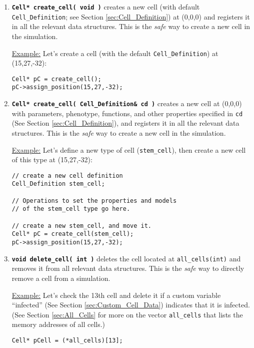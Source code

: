 \documentclass[12pt]{article}
\renewcommand{\v}{\verb}
\newcommand{\smallcode}[1]{\textbf{\texttt{#1}}}
\begin{document}
\begin{enumerate}

\item 
\smallcode{Cell* create\_cell( void )} creates a new cell (with 
default \v|Cell_Definition|; see Section \ref{sec:Cell_Definition}) at 
(0,0,0) and registers it in all the relevant data structures. 
This is the \emph{safe} way to create a new cell in the simulation. 

\underline{Example:} Let's create a cell (with the default 
\v|Cell_Definition|) at (15,27,-32): 

\begin{verbatim}
Cell* pC = create_cell(); 
pC->assign_position(15,27,-32);
\end{verbatim}

\item 
\smallcode{Cell* create\_cell( Cell\_Definition\& cd )} 
creates a new cell at (0,0,0) with parameters, phenotype, functions, 
and other properties specified in \v|cd| 
(See Section \ref{sec:Cell_Definition}),  and registers it in all the 
relevant data structures. 
This is the \emph{safe} way to create a new cell in the simulation. 

\underline{Example:} Let's define a new type of cell (\v|stem_cell|), then 
create a new cell of this type at (15,27,-32): 

\begin{verbatim}
// create a new cell definition 
Cell_Definition stem_cell; 

// Operations to set the properties and models 
// of the stem_cell type go here. 

// create a new stem_cell, and move it. 
Cell* pC = create_cell(stem_cell); 
pC->assign_position(15,27,-32);
\end{verbatim}

\item 
\smallcode{void delete\_cell( int )} deletes the cell 
located at \v|all_cells(int)| and removes it from 
all relevant data structures.  
This is the \emph{safe} way to directly remove a cell 
from a simulation. 

\underline{Example:} Let's check the 13th cell and delete it 
if a custom variable ``infected'' (See Section \ref{sec:Custom_Cell_Data}) indicates that 
 it is infected. (See Section \ref{sec:All_Cells} for more 
on the vector \v|all_cells| that lists the memory addresses of all cells.)
 
\begin{verbatim}
Cell* pCell = (*all_cells)[13]; 


\end{verbatim}
\end{enumerate}
\end{document}
